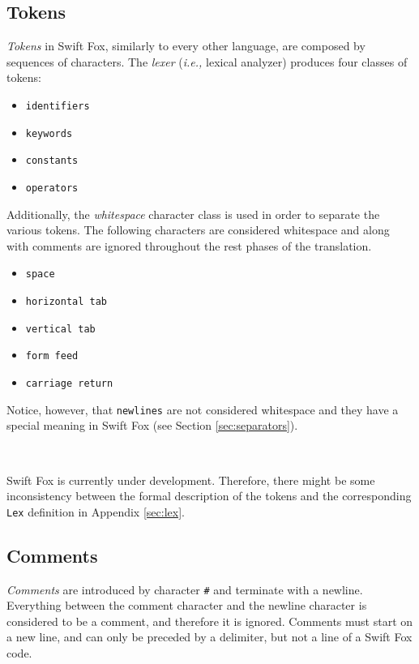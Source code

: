 \subsection{Tokens}

\textit{Tokens} in Swift Fox, similarly to every other language, are
composed by sequences of characters. The \textit{lexer} (\textit{i.e.,}
lexical analyzer) produces four classes of tokens:
\begin{itemize}
	\item \texttt{identifiers}
	\item \texttt{keywords}
	\item \texttt{constants}
	\item \texttt{operators}
\end{itemize}

Additionally, the \textit{whitespace} character class is used in order to
separate the various tokens. The following characters are considered
whitespace and along with comments are ignored throughout the rest phases
of the translation.

\begin{itemize}
	\item \texttt{space}
	\item \texttt{horizontal tab}
	\item \texttt{vertical tab}
	\item \texttt{form feed}
	\item \texttt{carriage return}
\end{itemize}

Notice, however, that \texttt{newlines} are not considered whitespace and
they have a special meaning in Swift Fox (see Section
\ref{sec:separators}).

\

\hangindent=4cm
\small
\noindent
Swift Fox is currently under development. Therefore, there might be some
inconsistency between the formal description of the tokens and the
corresponding \texttt{Lex} definition in Appendix \ref{sec:lex}.
\normalsize

\subsection{Comments}

\textit{Comments} are introduced by character \texttt{\#} and terminate
with a newline. Everything between the comment character and the newline
character is considered to be a comment, and therefore it is ignored.
Comments must start on a new line, and can only be preceded by a delimiter,
but not a line of a Swift Fox code.

